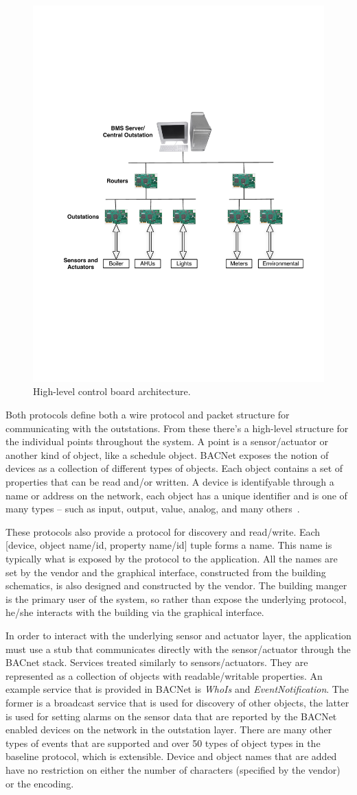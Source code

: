 \begin{figure}[h!] %
\centering
\includegraphics[width=0.50\columnwidth]{figs/BMS_network}
\caption{High-level control board architecture.}
\label{fig:bms_network}
\end{figure}

Both protocols define both a wire protocol and packet structure for communicating with the outstations.  From these there's a high-level
structure for the individual points throughout the system.  A point is a sensor/actuator or another kind of object, like a schedule object.
BACNet exposes the notion of devices as a collection of different types of objects.  Each object contains a set of properties that can 
be read and/or written.  A device is identifyable through a name or address on the network, each object has a unique identifier and is one of
many types -- such as input, output, value, analog, and many others~\cite{Bacnet}.  

These protocols also provide a protocol for discovery and read/write.  Each [device, object name/id, property name/id] tuple forms a name.
This name is typically what is exposed by the protocol to the application.  All the names are set by the vendor and the graphical interface, 
constructed from the building schematics, is also designed and constructed by the vendor.  The building manger is the primary user of the system,
so rather than expose the underlying protocol, he/she interacts with the building via the graphical interface.

In order to interact with the underlying sensor and actuator layer, the application must use a stub that communicates directly with the 
sensor/actuator through the BACnet stack.  Services treated similarly to sensors/actuators.  They are represented as a collection of 
objects with readable/writable properties.  An example service that is provided in BACNet is  \emph{WhoIs} and \emph{EventNotification}.
The former is a broadcast service that is used for discovery of other objects, the latter is used for setting alarms on the sensor data that
are reported by the BACNet enabled devices on the network in the outstation layer.  There are many other types of events that are supported 
and over 50 types of object types in the baseline protocol, which is extensible.  Device and object names that are added have no restriction
on either the number of characters (specified by the vendor) or the encoding.


